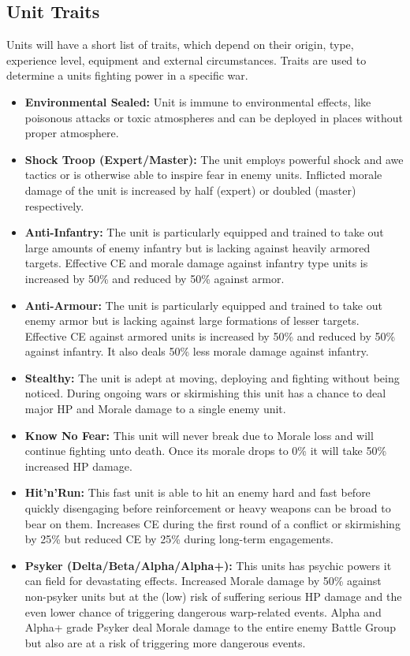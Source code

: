 \subsection{Unit Traits}
Units will have a short list of traits, which depend on their origin, type, experience level, equipment and external circumstances.
Traits are used to determine a units fighting power in a specific war.
\begin{itemize}
	\item \textbf{Environmental Sealed:} Unit is immune to environmental effects, like poisonous attacks or toxic atmospheres and can be deployed in places without proper atmosphere.
	\item \textbf{Shock Troop (Expert/Master):} The unit employs powerful shock and awe tactics or is otherwise able to inspire fear in enemy units. Inflicted morale damage of the unit is increased by half (expert) or doubled (master) respectively.
	\item \textbf{Anti-Infantry:} The unit is particularly equipped and trained to take out large amounts of enemy infantry but is lacking against heavily armored targets. Effective CE and morale damage against infantry type units is increased by 50\% and reduced by 50\% against armor.
	\item \textbf{Anti-Armour:} The unit is particularly equipped and trained to take out enemy armor but is lacking against large formations of lesser targets. Effective CE against armored units is increased by 50\% and reduced by 50\% against infantry. It also deals 50\% less morale damage against infantry.
	\item \textbf{Stealthy:} The unit is adept at moving, deploying and fighting without being noticed. During ongoing wars or skirmishing this unit has a chance to deal major HP and Morale damage to a single enemy unit.
	\item \textbf{Know No Fear:} This unit will never break due to Morale loss and will continue fighting unto death. Once its morale drops to 0\% it will take 50\% increased HP damage.
	\item \textbf{Hit'n'Run:} This fast unit is able to hit an enemy hard and fast before quickly disengaging before reinforcement or heavy weapons can be broad to bear on them. Increases CE during the first round of a conflict or skirmishing by 25\% but reduced CE by 25\% during long-term engagements.
 	\item \textbf{Psyker (Delta/Beta/Alpha/Alpha+):} This units has psychic powers it can field for devastating effects. Increased Morale damage by 50\% against non-psyker units but at the (low) risk of suffering serious HP damage and the even lower chance of triggering dangerous warp-related events. Alpha and Alpha+ grade Psyker deal Morale damage to the entire enemy Battle Group but also are at a risk of triggering more dangerous events.

\end{itemize}

